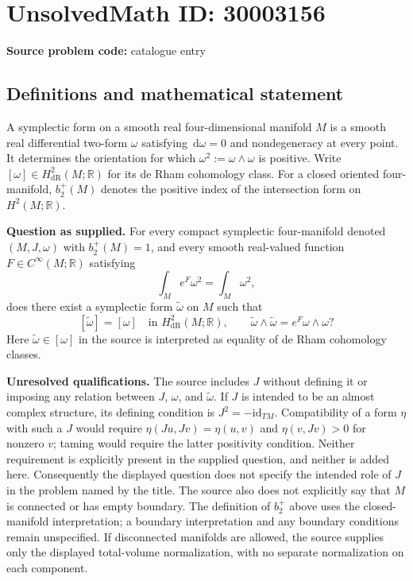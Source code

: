 \documentclass[11pt]{article}
\newcommand{\R}{\mathbb{R}}
\newcommand{\dd}{\,\mathrm{d}}
\begin{document}
\section*{UnsolvedMath ID: 30003156}
\textbf{Source problem code:} catalogue entry
\subsection{Definitions and mathematical statement}
A symplectic form on a smooth real four-dimensional manifold \(M\) is a smooth real differential two-form \(\omega\) satisfying \(\dd\omega=0\) and nondegeneracy at every point. It determines the orientation for which \(\omega^2:=\omega\wedge\omega\) is positive. Write \([\omega]\in H^2_{\mathrm{dR}}(M;\R)\) for its de Rham cohomology class. For a closed oriented four-manifold, \(b_2^+(M)\) denotes the positive index of the intersection form on \(H^2(M;\R)\).

\textbf{Question as supplied.} For every compact symplectic four-manifold denoted \((M,J,\omega)\) with \(b_2^+(M)=1\), and every smooth real-valued function \(F\in C^\infty(M;\R)\) satisfying
\[
\int_M e^F\omega^2=\int_M\omega^2,
\]
does there exist a symplectic form \(\widetilde{\omega}\) on \(M\) such that
\[
[\widetilde{\omega}]=[\omega]\quad\text{in }H^2_{\mathrm{dR}}(M;\R),
\qquad
\widetilde{\omega}\wedge\widetilde{\omega}
=e^F\omega\wedge\omega?
\]
Here \(\widetilde{\omega}\in[\omega]\) in the source is interpreted as equality of de Rham cohomology classes.

\textbf{Unresolved qualifications.} The source includes \(J\) without defining it or imposing any relation between \(J\), \(\omega\), and \(\widetilde{\omega}\). If \(J\) is intended to be an almost complex structure, its defining condition is \(J^2=-\mathrm{id}_{TM}\). Compatibility of a form \(\eta\) with such a \(J\) would require \(\eta(Ju,Jv)=\eta(u,v)\) and \(\eta(v,Jv)>0\) for nonzero \(v\); taming would require the latter positivity condition. Neither requirement is explicitly present in the supplied question, and neither is added here. Consequently the displayed question does not specify the intended role of \(J\) in the problem named by the title. The source also does not explicitly say that \(M\) is connected or has empty boundary. The definition of \(b_2^+\) above uses the closed-manifold interpretation; a boundary interpretation and any boundary conditions remain unspecified. If disconnected manifolds are allowed, the source supplies only the displayed total-volume normalization, with no separate normalization on each component.
\end{document}
